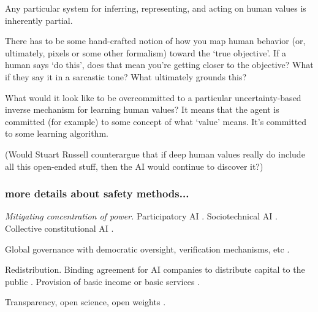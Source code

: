 Any particular system for inferring, representing, and acting on human values is inherently partial.

There has to be some hand-crafted notion of how you map human behavior (or, ultimately, pixels or some other formalism) toward the `true objective'. If a human says `do this', does that mean you're getting closer to the objective? What if they say it in a sarcastic tone? What ultimately grounds this? \citep{jeon2020reward}

What would it look like to be overcommitted to a particular uncertainty-based inverse mechanism for learning human values? It means that the agent is committed (for example) to some concept of what `value' means. It's committed to some learning algorithm. 


(Would Stuart Russell counterargue that if deep human values really do include all this open-ended stuff, then the AI would continue to discover it?)






\subsubsection{more details about safety methods...}

\textit{Mitigating concentration of power.} Participatory AI \citep{birhane2022power, sloane2022participation}. Sociotechnical AI \citep{selbst2019fairness, lazar2023ai}. Collective constitutional AI \citep{huang2024collective}.

Global governance with democratic oversight, verification mechanisms, etc \citep{bostrom2014superintelligence, dafoe2018ai, openai2023democratic}. 

Redistribution. Binding agreement for AI companies to distribute capital to the public \citep{okeefe2020windfall}. Provision of basic income or basic services \citep{sharp2025agentic, gough2019universal, susskind2020world}. 

Transparency, open science, open weights \citep{widder2023open}. 

